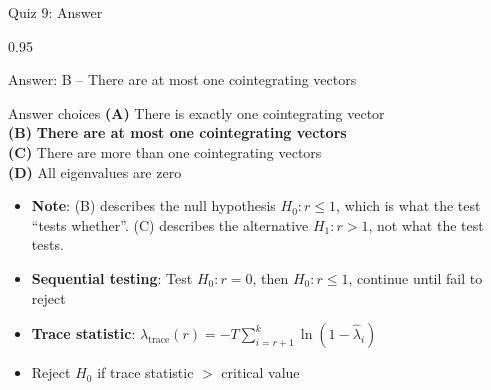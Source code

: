 \documentclass[9pt, aspectratio=169, t]{beamer}
\begin{document}
\begin{frame}{Quiz 9: Answer}
    \begin{cminipage}{0.95\textwidth}
    \begin{exampleblock}{Answer: B -- There are at most one cointegrating vectors}

    \begin{block}{Answer choices}
        \textcolor{MainBlue}{\textbf{(A)}} There is exactly one cointegrating vector \incorrect\\[3pt]
        \textcolor{MainBlue}{\textbf{(B)}} \textbf{\textcolor{Forest}{There are at most one cointegrating vectors}} \correct\\[3pt]
        \textcolor{MainBlue}{\textbf{(C)}} There are more than one cointegrating vectors \incorrect\\[3pt]
        \textcolor{MainBlue}{\textbf{(D)}} All eigenvalues are zero \incorrect
    \end{block}

        \vspace{0.2cm}

        \begin{itemize}\setlength{\itemsep}{0pt}
            \item {\footnotesize \textbf{Note}: (B) describes the null hypothesis $H_0: r \leq 1$, which is what the test ``tests whether''. (C) describes the alternative $H_1: r > 1$, not what the test tests.}
            \item \textbf{Sequential testing}: Test $H_0: r = 0$, then $H_0: r \leq 1$, continue until fail to reject
            \item \textbf{Trace statistic}: $\lambda_{\text{trace}}(r) = -T \sum_{i=r+1}^{k} \ln(1 - \hat{\lambda}_i)$
            \item Reject $H_0$ if trace statistic $>$ critical value
        \end{itemize}
    \end{exampleblock}

    \end{cminipage}
\end{frame}
\end{document}
